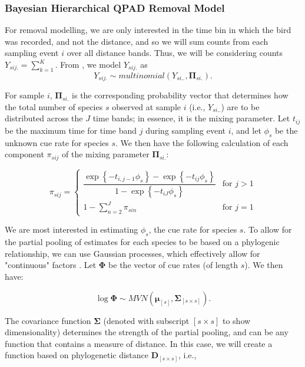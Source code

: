 \documentclass[12pt]{article}
\begin{document}
\subsubsection{Bayesian Hierarchical QPAD Removal Model}

\par For removal modelling, we are only interested in the time bin in which the bird was recorded, and not the distance, and so we will sum counts from each sampling event $i$ over all distance bands. 
Thus, we will be considering counts $Y_{sij.} = \sum_{k=1}^{K}$. 
From \citet{solymos_calibrating_2013}, we model $Y_{sij.}$ as
$$Y_{sij.} \sim multinomial\left(Y_{si..}, \mathbf{\Pi}_{si.}\right).$$

\par For sample $i$, $\mathbf{\Pi}_{si.}$ is the corresponding probability vector that determines how the total number of species $s$ observed at sample $i$ (i.e., $Y_{si..}$) are to be distributed across the $J$ time bands; in essence, it is the mixing parameter.
Let $t_{ij}$ be the maximum time for time band $j$ during sampling event $i$, and let $\phi_s$ be the unknown cue rate for species $s$.
We then have the following calculation of each component $\pi_{sij}$ of the mixing parameter $\mathbf{\Pi}_{si.}$:

\begin{equation*}
	\pi_{sij} = 
	\begin{cases}
		\dfrac{\exp\left\{ -t_{i,j-1}\phi_{s} \right\} - \exp\left\{ -t_{ij}\phi_{s} \right\}}{1 - \exp\left\{ -t_{iJ}\phi_{s} \right\}} & \text{for } j > 1 \\
		1 - \sum_{n = 2}^{J} \pi_{sin} & \text{for } j = 1
	\end{cases}
\end{equation*}

\par We are most interested in estimating $\phi_s$, the cue rate for species $s$. 
To allow for the partial pooling of estimates for each species to be based on a phylogenic relationship, we can use Gaussian processes, which effectively allow for "continuous" factors \citep{bernardo_regression_1998, mcelreath_continous_2020}. 
Let $\mathbf{\Phi}$ be the vector of cue rates (of length $s$). 
We then have:

$$\log \mathbf{\Phi} \sim MVN\left( \mathbf{\mu}_{[s]}, \mathbf{\Sigma}_{[s \times s]} \right).$$

\par The covariance function $\mathbf{\Sigma}$ (denoted with subscript $[s \times s]$ to show dimensionality) determines the strength of the partial pooling, and can be any function that contains a measure of distance. 
In this case, we will create a function based on phylogenetic distance $\mathbf{D}_{[s \times s]}$, i.e.,
\end{document}
